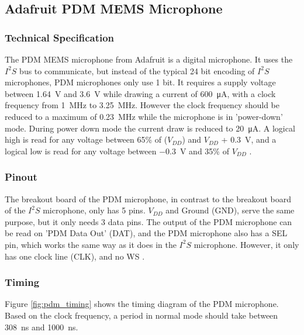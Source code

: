\subsection{Adafruit PDM MEMS Microphone}

\subsubsection{Technical Specification}

The PDM MEMS microphone from Adafruit \cite{pdm_mic} is a digital microphone.
It uses the $I^2S$ bus to communicate, but instead of the typical 24 bit encoding of $I^2S$ microphones, PDM microphones only use 1 bit.
It requires a supply voltage between \SI{1.64}{\volt} and \SI{3.6}{\volt} while drawing a current of \SI{600}{\micro\ampere}, with a clock
frequency from \SI{1}{\mega\hertz} to \SI{3.25}{\mega\hertz}.
However the clock frequency should be reduced to a maximum of \SI{0.23}{\mega\hertz} while the microphone is in 'power-down' mode.
During power down mode the current draw is reduced to \SI{20}{\micro\ampere}.
A logical high is read for any voltage between 65\% of ($V_{DD}$) and $V_{DD}$ + \SI{0.3}{\volt},
and a logical low is read for any voltage between \SI{-0.3}{\volt} and 35\% of $V_{DD}$ \cite{pdm_mic_datasheet}.

\subsubsection{Pinout}

The breakout board of the PDM microphone, in contrast to the breakout board of the $I^2S$ microphone, only has 5 pins.
$V_{DD}$ and Ground (GND), serve the same purpose, but it only needs 3 data pins.
The output of the PDM microphone can be read on 'PDM Data Out' (DAT), and the PDM microphone also has a SEL pin, which works the same way as
it does in the $I^2S$ microphone.
However, it only has one clock line (CLK), and no WS \cite{pdm_mic_pinout}.

\subsubsection{Timing}

Figure \ref{fig:pdm_timing} shows the timing diagram of the PDM microphone.
Based on the clock frequency, a period in normal mode should take between \SI{308}{\nano\second} and \SI{1000}{\nano\second}.


